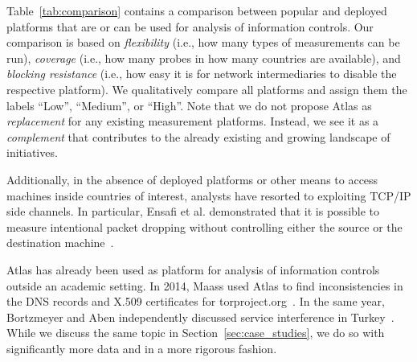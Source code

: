 Table~\ref{tab:comparison} contains a comparison between popular and deployed
platforms that are or can be used for analysis of information controls.  Our comparison is
based on \emph{flexibility} (i.e., how many types of measurements can be run),
\emph{coverage} (i.e., how many probes in how many countries are available),
and \emph{blocking resistance} (i.e., how easy it is for network intermediaries to disable the
respective platform).  We qualitatively compare all platforms and assign them
the labels ``Low'', ``Medium'', or ``High''.  Note that we do not propose
Atlas as \emph{replacement} for any existing measurement platforms.
Instead, we see it as a \emph{complement} that contributes to the already
existing and growing landscape of initiatives.

Additionally, in the absence of deployed platforms or other means to access
machines inside countries of interest, analysts have resorted to
exploiting TCP/IP side channels.  In particular, Ensafi et al. demonstrated
that it is possible to measure intentional packet dropping without controlling
either the source or the destination machine~\cite{Ensafi2014}.

Atlas has already been used as platform for analysis of information controls outside an
academic setting.  In 2014, Maass used Atlas to find inconsistencies in the DNS
records and X.509 certificates for torproject.org~\cite{Maass2014}.  In the
same year, Bortzmeyer and Aben independently discussed service interference in
Turkey~\cite{Bortzmeyer14,Aben14}.  While we discuss the same topic in
Section~\ref{sec:case_studies}, we do so with significantly more data and in a
more rigorous fashion.
